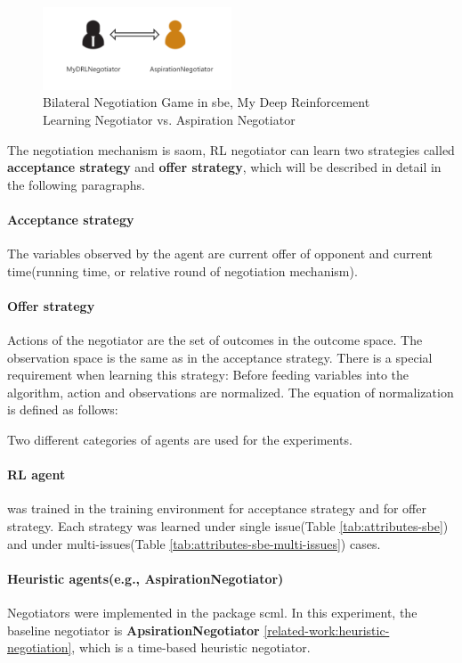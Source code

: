 \begin{figure}[htbp]
\centering
\includegraphics[width=0.50\textwidth]{./images/bilateral-negotiation.png}
\caption{Bilateral Negotiation Game in \gls{sbe}, My Deep Reinforcement Learning Negotiator vs. Aspiration Negotiator}
\label{fig:bilateral-negotiation}
\end{figure}

The negotiation mechanism is \gls{saom}, RL negotiator can learn two strategies called \textbf{acceptance strategy} and \textbf{offer strategy}, which will be described in detail in the following paragraphs. 

\paragraph{Acceptance strategy} The variables observed by the agent are current offer of opponent and current time(running time, or relative round of negotiation mechanism).

\paragraph{Offer strategy} Actions of the negotiator are the set of outcomes in the outcome space. The observation space is the same as in the acceptance strategy. There is a special requirement when learning this strategy: Before feeding variables into the algorithm, action and observations are normalized. The equation of normalization is defined as follows:

Two different categories of agents are used for the experiments.

\paragraph{RL agent} was trained in the training environment for acceptance strategy and for offer strategy. Each strategy was learned under single issue(Table \ref{tab:attributes-sbe}) and under multi-issues(Table \ref{tab:attributes-sbe-multi-issues}) cases.

\paragraph{Heuristic agents(e.g., AspirationNegotiator)} Negotiators were implemented in the package scml. In this experiment, the baseline negotiator is \textbf{ApsirationNegotiator} \ref{related-work:heuristic-negotiation}, which is a time-based heuristic negotiator.

